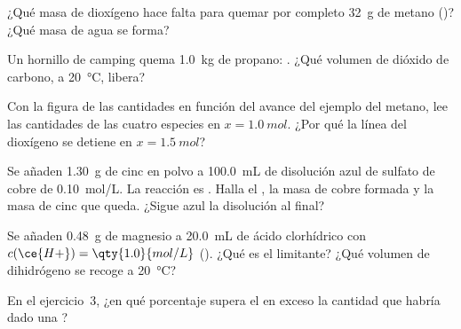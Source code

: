 \begin{exercise}[$\star\star$]\label{exo:g10:reaction-progress-table:6}
¿Qué masa de dioxígeno hace falta para quemar por completo \qty{32}{g}
de metano ()? ¿Qué masa de agua se forma?
\end{exercise}

\begin{exercise}[$\star\star$]\label{exo:g10:reaction-progress-table:7}
Un hornillo de camping quema \qty{1.0}{kg} de propano:
. ¿Qué volumen de dióxido de carbono, a
\qty{20}{\celsius}, libera?
\end{exercise}

\begin{exercise}[$\star\star$]\label{exo:g10:reaction-progress-table:8}
Con la figura de las cantidades en función del avance del ejemplo del
metano, lee las cantidades de las cuatro especies en
$x = \qty{1.0}{mol}$. ¿Por qué la línea del dioxígeno se detiene en
$x = \qty{1.5}{mol}$?
\end{exercise}

\begin{exercise}[$\star\star$]\label{exo:g10:reaction-progress-table:9}
Se añaden \qty{1.30}{g} de cinc en polvo a \qty{100.0}{mL} de
disolución azul de sulfato de cobre de \qty{0.10}{mol/L}. La reacción es
.
Halla el , la masa de cobre formada y la masa de cinc
que queda. ¿Sigue azul la disolución al final?
\end{exercise}

\begin{exercise}[$\star\star$]\label{exo:g10:reaction-progress-table:10}
Se añaden \qty{0.48}{g} de magnesio a \qty{20.0}{mL} de ácido
clorhídrico con $c(\ce{H+}) = \qty{1.0}{mol/L}$
(). ¿Qué  es el limitante? ¿Qué
volumen de dihidrógeno se recoge a \qty{20}{\celsius}?
\end{exercise}

\begin{exercise}[$\star\star$]\label{exo:g10:reaction-progress-table:11}
En el ejercicio~3, ¿en qué porcentaje supera el  en exceso la
cantidad que habría dado una ?
\end{exercise}

